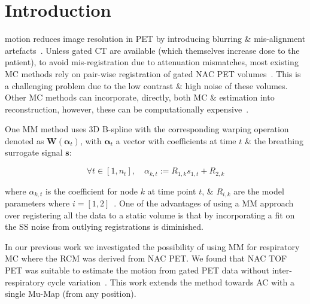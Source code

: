 \section{Introduction} \label{sec:introduction}
     motion reduces image resolution in \gls{PET} by introducing blurring \& mis-alignment artefacts~\cite{Nehmeh2008a}. Unless gated \gls{CT} are available (which themselves increase dose to the patient), to avoid mis-registration due to attenuation mismatches, most existing \gls{MC} methods rely on pair-wise registration of gated \gls{NAC} \gls{PET} volumes~\cite{LungMotionDiaphragmBaiBib}.%
    This is a challenging problem due to the low contrast \& high noise of these volumes. Other \gls{MC} methods can incorporate, directly, both \gls{MC} \&  estimation into reconstruction, however, these can be computationally expensive~\cite{Bousse2016b}.
    
    One \gls{MM} method uses \gls{3D} B-spline  with the corresponding warping operation denoted as $\mathbf{W}(\mathbf{\alpha}_t)$, with $\mathbf{\alpha}_t$ a vector with coefficients at time $t$ \& the breathing surrogate signal $\mathbf{s}$:
    
    \vspace{-0.5cm}
    
    \begin{equation}
        \forall t \in [1, n_t],\quad \alpha_{k, t} := R_{1, k} s_{1, t} + R_{2, k}
    \end{equation}
    
    \vspace{-0.25cm}
    
    \noindent where $\alpha_{k, t}$ is the coefficient for node $k$ at time point $t$, \& $R_{i, k}$ are the model parameters where $i = [1, 2]$~\cite{McClelland2017}. One of the advantages of using a \gls{MM} approach over registering all the data to a static volume is that by incorporating a fit on the \gls{SS} noise from outlying registrations is diminished.
    
    In our previous work we investigated the possibility of using \gls{MM} for respiratory \gls{MC} where the \gls{RCM} was derived from \gls{NAC} \gls{PET}. We found that \gls{NAC} \gls{TOF} \gls{PET} was suitable to estimate the motion from gated PET data without inter-respiratory cycle variation~\cite{Whitehead2019ImpactPET}. This work extends the method towards \gls{AC} with a single \gls{Mu-Map} (from any position).

